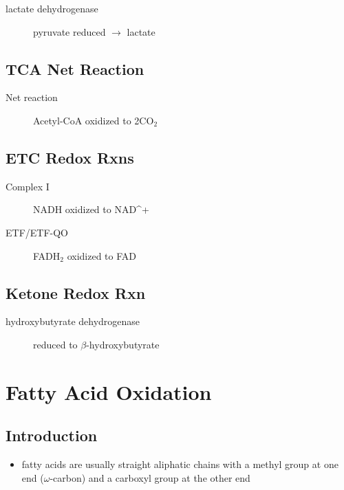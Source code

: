 \documentclass{scrartcl}
\begin{document}
\begin{description}
\item[{lactate dehydrogenase}] pyruvate reduced \(\to\) lactate
\end{description}


\subsection{TCA Net Reaction}
\label{sec:org384c518}
\begin{description}
\item[{Net reaction}] Acetyl-CoA oxidized to 2CO\(_{\text{2}}\)
\end{description}
{\tiny{}}

\subsection{ETC Redox Rxns}
\label{sec:org9b91c79}
\begin{description}
\item[{Complex I}] NADH oxidized to NAD\^{}+
\end{description}


\begin{description}
\item[{ETF/ETF-QO}] FADH\(_{\text{2}}\) oxidized to FAD

\end{description}


\subsection{Ketone Redox Rxn}
\label{sec:orgc53a641}
\begin{description}
\item[{hydroxybutyrate dehydrogenase}] reduced to \(\beta\)-hydroxybutyrate

\end{description}

\section{Fatty Acid Oxidation}
\label{sec:org7065801}
\subsection{Introduction}
\label{sec:orgfa71253}
\begin{itemize}
\item fatty acids are usually straight aliphatic chains with a methyl
group at one end (\(\omega\)-carbon) and a carboxyl group at the other
end
\end{itemize}
\end{document}
